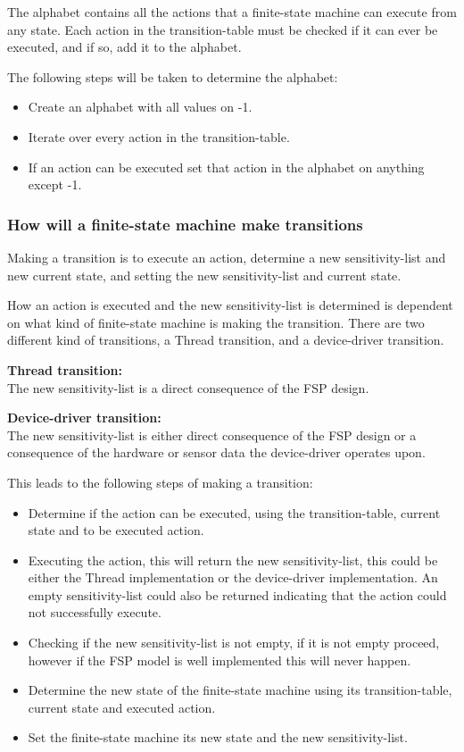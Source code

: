 The alphabet contains all the actions that a finite-state machine can
execute from any state. Each action in the transition-table must be
checked if it can ever be executed, and if so, add it to the alphabet.

The following steps will be taken to determine the alphabet:

\begin{itemize}
\tightlist
\item
  Create an alphabet with all values on -1.
\item
  Iterate over every action in the transition-table.
\item
  If an action can be executed set that action in the alphabet on
  anything except -1.
\end{itemize}

\hypertarget{how-will-a-finite-state-machine-make-transitions}{%
\subsubsection{How will a finite-state machine make
transitions}\label{how-will-a-finite-state-machine-make-transitions}}

Making a transition is to execute an action, determine a new
sensitivity-list and new current state, and setting the new
sensitivity-list and current state.

How an action is executed and the new sensitivity-list is determined is
dependent on what kind of finite-state machine is making the transition.
There are two different kind of transitions, a Thread transition, and a
device-driver transition.

\textbf{Thread transition:}\\
The new sensitivity-list is a direct consequence of the FSP design.

\textbf{Device-driver transition:}\\
The new sensitivity-list is either direct consequence of the FSP design
or a consequence of the hardware or sensor data the device-driver
operates upon.

This leads to the following steps of making a transition:

\begin{itemize}
\tightlist
\item
  Determine if the action can be executed, using the transition-table,
  current state and to be executed action.
\item
  Executing the action, this will return the new sensitivity-list, this
  could be either the Thread implementation or the device-driver
  implementation. An empty sensitivity-list could also be returned
  indicating that the action could not successfully execute.
\item
  Checking if the new sensitivity-list is not empty, if it is not empty
  proceed, however if the FSP model is well implemented this will never
  happen.
\item
  Determine the new state of the finite-state machine using its
  transition-table, current state and executed action.
\item
  Set the finite-state machine its new state and the new
  sensitivity-list.
\end{itemize}
